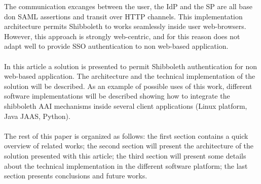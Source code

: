 The communication excanges between the user, the IdP and the SP are all base don SAML assertions and transit over HTTP channels.
This implementation architecture permits Shibboleth to works seamlessly inside user web-browsers.
However, this approach is strongly web-centric, and for this reason does not adapt well to provide SSO authentication to non web-based
application.\\
\\
In this article a solution is presented to permit Shibboleth authentication for non web-based application.
The architecture and the technical implementation of the solution will be described.
As an example of possible uses of this work, different software implementations will be described showing how to integrate the shibboleth AAI
mechanisms inside several client applications (Linux platform, Java JAAS, Python).\\
\\
The rest of this paper is organized as follows: the first section contains a quick overview of related works; the second section will present
the architecture of the solution presented with this article; the third section will present some details about the technical implementation
in the different software platform; the last section presents conclusions and future works.

\label{sec:relatedworks}
